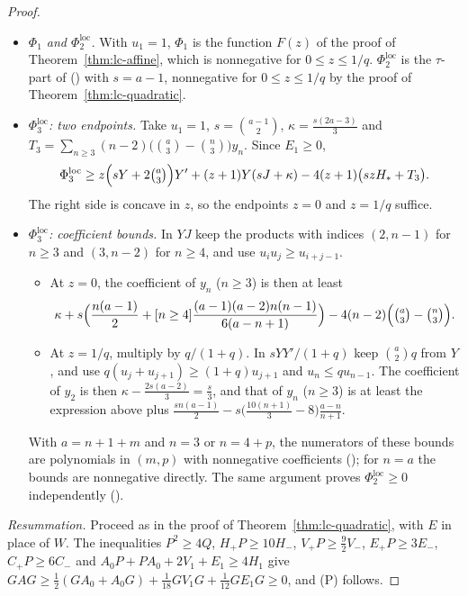 \documentclass[twoside,10pt]{article}
\numberwithin{equation}{section}
\theoremstyle{slbody}
\theoremstyle{definition}
\theoremstyle{remark}
\renewcommand{\eqref}[1]{\textup{{\normalfont(\oldstylenums{\ref{#1}}}\normalfont)}}
\begin{document}
\begin{proof}
\begin{itemize}
\[\]
Here $\Phi_\beta^{\mathrm{loc}}$ is $\Phi_\beta$ computed with $\rho(\ell+k)$ replaced by $\binom k\beta$. Its moves $V_1$ are formed with $\Gamma_n$ replaced by $n-1$ for $\beta=2$ and by $0$ for $\beta=3$, and its moves $E_1$ from $\binom n2f_{n-2}$, respectively $\binom n3(3f_{n-1}+3f_{n-2}+f_{n-3})$.
\item \emph{$\Phi_1$ and $\Phi_2^{\mathrm{loc}}$.} With $u_1=1$, $\Phi_1$ is the function $F(z)$ of the proof of Theorem~\ref{thm:lc-affine}, which is nonnegative for $0\leq z\leq1/q$. $\Phi_2^{\mathrm{loc}}$ is the $\tau$-part of \eqref{eq:quad-key} with $s=a-1$, nonnegative for $0\leq z\leq1/q$ by the proof of Theorem~\ref{thm:lc-quadratic}.
\item \emph{$\Phi_3^{\mathrm{loc}}$: two endpoints.} Take $u_1=1$, $s=\binom{a-1}2$, $\kappa=\frac{s(2a-3)}3$ and $T_3=\sum_{n\geq3}(n-2)\bigl(\binom a3-\binom n3\bigr)y_n$. Since $E_1\geq0$,
\[
\Phi_3^{\mathrm{loc}}\geq z\Bigl(sY+2\tbinom a3\Bigr)Y'+(z+1)Y(sJ+\kappa)-4(z+1)\bigl(szH_*+T_3\bigr).
\]
The right side is concave in $z$, so the endpoints $z=0$ and $z=1/q$ suffice.
\item \emph{$\Phi_3^{\mathrm{loc}}$: coefficient bounds.} In $YJ$ keep the products with indices $(2,n-1)$ for $n\geq3$ and $(3,n-2)$ for $n\geq4$, and use $u_iu_j\geq u_{i+j-1}$.
  \begin{itemize}
  \item At $z=0$, the coefficient of $y_n$ ($n\geq3$) is then at least
\[
\kappa+s\Bigl(\frac{n(a-1)}2+[n\geq4]\frac{(a-1)(a-2)n(n-1)}{6(a-n+1)}\Bigr)-4(n-2)\Bigl(\tbinom a3-\tbinom n3\Bigr).
\]
  \item At $z=1/q$, multiply by $q/(1+q)$. In $sYY'/(1+q)$ keep $\binom a2q$ from $Y$, and use $q(u_j+u_{j+1})\geq(1+q)u_{j+1}$ and $u_n\leq qu_{n-1}$. The coefficient of $y_2$ is then $\kappa-\frac{2s(a-2)}3=\frac s3$, and that of $y_n$ ($n\geq3$) is at least the expression above plus $\frac{sn(a-1)}2-s\bigl(\frac{10(n+1)}3-8\bigr)\frac{a-n}{n+1}$.
  \end{itemize}
  With $a=n+1+m$ and $n=3$ or $n=4+p$, the numerators of these bounds are polynomials in $(m,p)$ with nonnegative coefficients (); for $n=a$ the bounds are nonnegative directly. The same argument proves $\Phi_2^{\mathrm{loc}}\geq0$ independently ().
\end{itemize}

\emph{Resummation.} Proceed as in the proof of Theorem~\ref{thm:lc-quadratic}, with $E$ in place of $W$. The inequalities $P^2\geq4Q$, $H_+P\geq10H_-$, $V_+P\geq\frac92V_-$, $E_+P\geq3E_-$, $C_+P\geq6C_-$ and $A_0P+PA_0+2V_1+E_1\geq4H_1$ give $GAG\geq\frac12(GA_0+A_0G)+\frac1{18}GV_1G+\frac1{12}GE_1G\geq0$, and (P) follows.
\end{proof}
\end{document}

